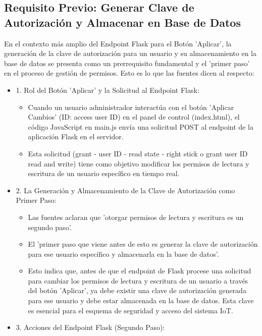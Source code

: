 \documentclass{report}
\begin{document}
\subsection{Requisito Previo: Generar Clave de Autorización y Almacenar en Base de Datos}
En el contexto más amplio del Endpoint Flask para el Botón 'Aplicar', la generación de la clave de autorización para un usuario y 
su almacenamiento en la base de datos se presenta como un prerrequisito fundamental y el 'primer paso' en el proceso de gestión de permisos. 
Esto es lo que las fuentes dicen al respecto:
\begin{itemize}
    \item 1. Rol del Botón 'Aplicar' y la Solicitud al Endpoint Flask:
        \begin{itemize}
            \item Cuando un usuario administrador interactúa con el botón 'Aplicar Cambios' (ID: access user ID) en el panel de control (index.html), 
            el código JavaScript en main.js envía una solicitud POST al endpoint de la aplicación Flask en el servidor.
            \item Esta solicitud (grant - user ID - read state - right stick o grant user ID read and write) tiene como objetivo modificar los permisos 
            de lectura y escritura de un usuario específico en tiempo real.
        \end{itemize}
    \item 2. La Generación y Almacenamiento de la Clave de Autorización como Primer Paso:
        \begin{itemize}
            \item Las fuentes aclaran que 'otorgar permisos de lectura y escritura es un segundo paso'.
            \item El 'primer paso que viene antes de esto es generar la clave de autorización para ese usuario específico y almacenarla en la base de datos'.
            \item Esto indica que, antes de que el endpoint de Flask procese una solicitud para cambiar los permisos de lectura y escritura de un usuario 
            a través del botón 'Aplicar', ya debe existir una clave de autorización generada para ese usuario y debe estar almacenada en la base de datos. 
            Esta clave es esencial para el esquema de seguridad y acceso del sistema IoT.
        \end{itemize}
    \item 3. Acciones del Endpoint Flask (Segundo Paso):

\end{itemize}
\end{document}
